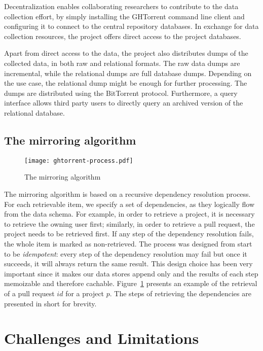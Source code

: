 \documentclass[conference]{IEEEtran}
\begin{document}
Decentralization enables collaborating researchers to contribute to the data
collection effort, by simply installing the GHTorrent command line client and
configuring it to connect to the central repository databases. In exchange
for data collection resources, the project offers direct access to the project
databases.

Apart from direct access to the data, the project also distributes dumps of the
collected data, in both raw and relational formats. The raw data dumps are
incremental, while the relational dumps are full database dumps. Depending on
the use case, the relational dump might be enough for further processing.  The
dumps are distributed using the BitTorrent protocol. Furthermore, a query
interface allows third party users to directly query an archived version of the
relational database.

\subsection{The mirroring algorithm}

\begin{figure}
  \begin{center}
    \texttt{[image: ghtorrent-process.pdf]}
  \end{center}
  \caption{The mirroring algorithm}
  \label{fig:mirror}
\end{figure}

The mirroring algorithm is based on a recursive dependency resolution process.
For each retrievable item, we specify a set of dependencies, as they logically
flow from the data schema. For example, in order to retrieve a \textsf{project},
it is necessary to retrieve the owning \textsf{user} first; similarly, in order
to retrieve a pull request, the \textsf{project} needs to be retrieved first. If
any step of the dependency resolution fails, the whole item is marked as
non-retrieved.  The process was designed from start to be \emph{idempotent}:
every step of the dependency resolution may fail but once it succeeds, it will
always return the same result. This design choice has been very important since
it makes our data stores append only and the results of each step memoizable and
therefore cachable. Figure~\ref{fig:mirror} presents an example of the retrieval
of a pull request $id$ for a project $p$.  The steps of retrieving the
dependencies are presented in short for brevity.

\section{Challenges and Limitations}
\end{document}
